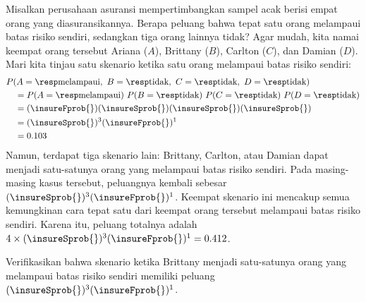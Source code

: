\begin{examplewrap}
\begin{nexample}{Misalkan perusahaan asuransi mempertimbangkan
    sampel acak berisi empat orang yang diasuransikannya.
    Berapa peluang bahwa tepat satu orang melampaui batas risiko sendiri,
    sedangkan tiga orang lainnya tidak? Agar mudah, kita namai keempat
    orang tersebut Ariana ($A$), Brittany ($B$), Carlton ($C$), dan
    Damian ($D$).}
  \label{insureOneOfFourExceedsDeductible}%
  Mari kita tinjau satu skenario ketika satu orang melampaui batas risiko
  sendiri:
  \begin{align*}
  &P(A=\text{\insureF{}},
      \text{ }B=\text{\insureS{}},
      \text{ }C=\text{\insureS{}},
      \text{ }D=\text{\insureS{}}) \\
    &\quad = P(A=\text{\insureF{}})\ 
        P(B=\text{\insureS{}})\ 
        P(C=\text{\insureS{}})\ 
        P(D=\text{\insureS{}}) \\
    &\quad =  (\insureFprob{})
        (\insureSprob{})
        (\insureSprob{})
        (\insureSprob{}) \\
    &\quad = (\insureSprob{})^3 (\insureFprob{})^1 \\
    &\quad = \insureBinomCinDSingleScenario{}
  \end{align*}
  Namun, terdapat tiga skenario lain: Brittany, Carlton, atau Damian
  dapat menjadi satu-satunya orang yang melampaui batas risiko sendiri.
  Pada masing-masing kasus tersebut, peluangnya kembali sebesar
  $(\insureSprob{})^3 (\insureFprob{})^1$.
  Keempat skenario ini mencakup semua kemungkinan cara tepat satu dari
  keempat orang tersebut melampaui batas risiko sendiri. Karena itu,
  peluang totalnya adalah
  $4 \times (\insureSprob{})^3 (\insureFprob{})^1
      = \insureBinomCinD{}$.
\end{nexample}
\end{examplewrap}

\begin{exercisewrap}
\begin{nexercise}
Verifikasikan bahwa skenario ketika Brittany menjadi satu-satunya orang
yang melampaui batas risiko sendiri memiliki peluang
$(\insureSprob{})^3 (\insureFprob{})^1$.~\footnotemark{}
\end{nexercise}
\end{exercisewrap}


